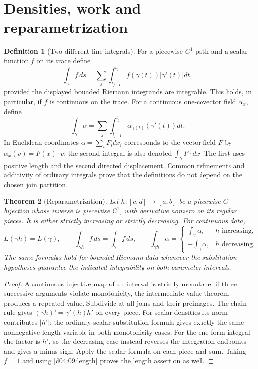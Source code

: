 \documentclass[11pt,oneside,openany]{book}
\newtheorem{theorem}{Theorem}[chapter]
\theoremstyle{definition}
\newtheorem{definition}[theorem]{Definition}
\theoremstyle{remark}
\newcommand{\family}[1]{}
\begin{document}
\section{Densities, work and reparametrization}
\family{K04.09.04}\family{K04.09.05}\family{K04.09.06}
\begin{definition}[Two different line integrals]\label{d04:09:integrals}
For a piecewise $C^1$ path and a scalar function $f$ on its trace define
\[
 \int_\gamma f\,ds=\sum_j\int_{t_{j-1}}^{t_j}f(\gamma(t))|\gamma'(t)|dt,
\]
provided the displayed bounded Riemann integrands are integrable. This
holds, in particular, if $f$ is continuous on the trace. For a continuous
one-covector field $\alpha_x$, define
\[
 \int_\gamma\alpha=\sum_j\int_{t_{j-1}}^{t_j}
       \alpha_{\gamma(t)}(\gamma'(t))dt.
\]
In Euclidean coordinates $\alpha=\sum_iF_i dx_i$ corresponds to the vector
field $F$ by $\alpha_x(v)=F(x)\cdot v$; the second integral is also denoted
$\int_\gamma F\cdot d x$. The first uses positive length and the second
directed displacement. Common refinements and additivity of ordinary
integrals prove that the definitions do not depend on the chosen join partition.
\end{definition}

\begin{theorem}[Reparametrization]\label{d04:09:reparametrize}
Let $h:[c,d]\to[a,b]$ be a piecewise $C^1$ bijection whose inverse is
piecewise $C^1$, with derivative nonzero on its regular pieces. It is either
strictly increasing or strictly decreasing. For continuous data,
\[
 L(\gamma h)=L(\gamma),\qquad
 \int_{\gamma h}f\,ds=\int_\gamma f\,ds,\qquad
 \int_{\gamma h}\alpha=\begin{cases}
 \int_\gamma\alpha,&h\text{ increasing},\\
 -\int_\gamma\alpha,&h\text{ decreasing}.
 \end{cases}
\]
The same formulas hold for bounded Riemann data whenever the substitution
hypotheses guarantee the indicated integrability on both parameter intervals.
\end{theorem}
\begin{proof}
A continuous injective map of an interval is strictly monotone: if three
successive arguments violate monotonicity, the intermediate-value theorem
produces a repeated value. Subdivide at all joins and their preimages.
The chain rule gives $(\gamma h)'=\gamma'(h)h'$ on every piece.
For scalar densities its norm contributes $|h'|$; the ordinary scalar
substitution formula gives exactly the same nonnegative length variable in
both monotonicity cases. For the one-form integral the factor is $h'$, so
the decreasing case instead reverses the integration endpoints and gives
a minus sign. Apply the scalar formula on each piece and sum. Taking
$f=1$ and using \cref{d04:09:length} proves the length assertion as well.
\end{proof}
\end{document}
